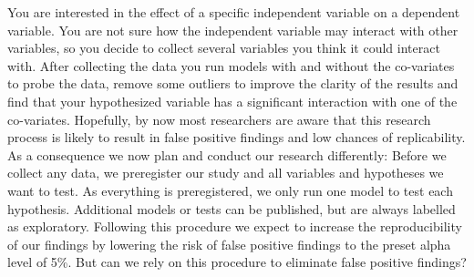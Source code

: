 You are interested in the effect of a specific independent variable on a dependent variable. You are not sure how the independent variable may interact with other variables, so you decide to collect several variables you think it could interact with. After collecting the data you run models with and without the co-variates to probe the data, remove some outliers to improve the clarity of the results and find that your hypothesized variable has a significant interaction with one of the co-variates. Hopefully, by now most researchers are aware that this research process is likely to result in false positive findings and low chances of replicability. As a consequence we now plan and conduct our research differently: Before we collect any data, we preregister our study and all variables and hypotheses we want to test. As everything is preregistered, we only run one model to test each hypothesis. Additional models or tests can be published, but are always labelled as exploratory. Following this procedure we expect to increase the reproducibility of our findings by lowering the risk of false positive findings to the preset alpha level of 5\%. But can we rely on this procedure to eliminate false positive findings? \\

